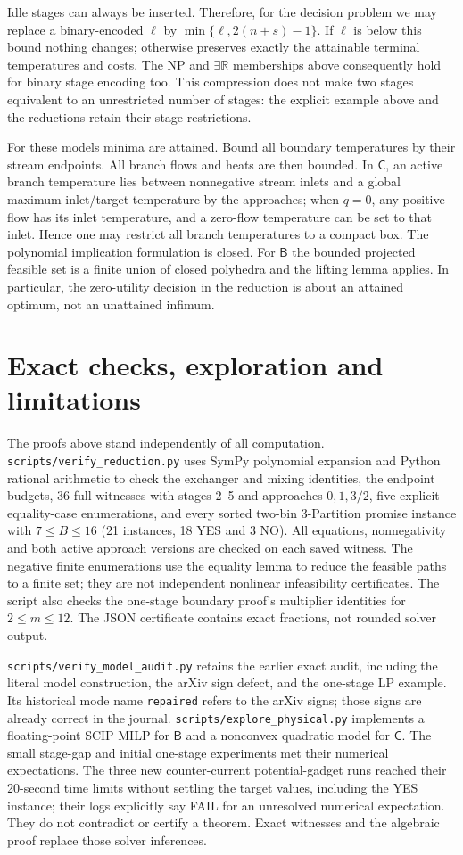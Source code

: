 \documentclass[11pt,a4paper]{report}
\newcommand{\CC}{\mathsf{C}}
\newcommand{\BB}{\mathsf{B}}
\newcommand{\ER}{\exists\mathbb{R}}
\begin{document}
Idle stages can always be inserted. Therefore, for the decision problem we
may replace a binary-encoded $\ell$ by
$\min\{\ell,2(n+s)-1\}$. If $\ell$ is below this bound nothing changes;
otherwise  preserves exactly the attainable terminal
temperatures and costs. The NP and $\ER$ memberships above consequently
hold for binary stage encoding too. This compression does not make two
stages equivalent to an unrestricted number of stages: the explicit example
above and the reductions retain their stage restrictions.

For these models minima are attained. Bound all boundary temperatures by
their stream endpoints. All branch flows and heats are then bounded.
In $\CC$, an active branch temperature lies between nonnegative stream
inlets and a global maximum inlet/target temperature by the approaches;
when $q=0$, any positive flow has its inlet temperature, and a zero-flow
temperature can be set to that inlet. Hence one may restrict all branch
temperatures to a compact box. The polynomial implication formulation is
closed. For $\BB$ the bounded projected feasible set is a finite union of
closed polyhedra and the lifting lemma applies. In particular, the
zero-utility decision in the reduction is about an attained optimum, not
an unattained infimum.

\section{Exact checks, exploration and limitations}
The proofs above stand independently of all computation.
\texttt{scripts/verify\_reduction.py} uses SymPy polynomial expansion and
Python rational arithmetic to check the exchanger and mixing identities,
the endpoint budgets, 36 full witnesses with stages 2--5 and approaches
$0,1,3/2$, five explicit equality-case enumerations, and every sorted two-bin
3-Partition promise instance with $7\leq B\leq16$ (21 instances, 18 YES and
3 NO). All equations, nonnegativity and both active approach versions are
checked on each saved witness. The negative finite enumerations use the
equality lemma to reduce the feasible paths to a finite set; they are not
independent nonlinear infeasibility certificates. The script also checks
the one-stage boundary proof's multiplier identities for $2\leq m\leq12$.
The JSON certificate contains exact fractions, not rounded solver output.

\texttt{scripts/verify\_model\_audit.py} retains the earlier exact audit,
including the literal model construction, the arXiv sign defect, and the
one-stage LP example. Its historical mode name \texttt{repaired} refers to
the arXiv signs; those signs are already correct in the journal.
\texttt{scripts/explore\_physical.py} implements a floating-point SCIP MILP
for $\BB$ and a nonconvex quadratic model for $\CC$. The small stage-gap and
initial one-stage experiments met their numerical expectations. The three
new counter-current potential-gadget runs reached their 20-second time
limits without settling the target values, including the YES instance;
their logs explicitly say FAIL for an unresolved numerical expectation.
They do not contradict or certify a theorem. Exact witnesses and the
algebraic proof replace those solver inferences.
\end{document}
